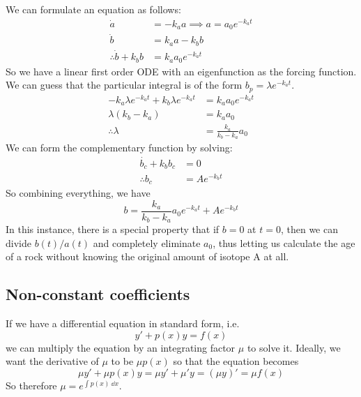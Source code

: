 We can formulate an equation as follows:
\begin{align*}
	\dot a                    & = -k_a a \implies a = a_0 e^{-k_a t} \\
	\dot b                    & = k_a a - k_b b                      \\
	\therefore \dot b + k_b b & = k_a a_0 e^{-k_a t}
\end{align*}
So we have a linear first order ODE with an eigenfunction as the forcing function.
We can guess that the particular integral is of the form \(b_p = \lambda e^{-k_a t}\).
\begin{align*}
	-k_a\lambda e^{-k_a t} + k_b \lambda e^{-k_a t} & = k_a a_0 e^{-k_a t}        \\
	\lambda(k_b-k_a)                                & = k_a a_0                   \\
	\therefore \lambda                              & = \frac{k_a}{k_b - k_a} a_0
\end{align*}
We can form the complementary function by solving:
\begin{align*}
	\dot{b_c} + k_b b_c & = 0           \\
	\therefore b_c      & = Ae^{-k_b t}
\end{align*}
So combining everything, we have
\[
	b = \frac{k_a}{k_b - k_a} a_0 e^{-k_a t} + Ae^{-k_b t}
\]
In this instance, there is a special property that if \(b=0\) at \(t=0\), then we can divide \(b(t)/a(t)\) and completely eliminate \(a_0\), thus letting us calculate the age of a rock without knowing the original amount of isotope A at all.

\subsection{Non-constant coefficients}
If we have a differential equation in standard form, i.e.
\[
	y' + p(x)y = f(x)
\]
we can multiply the equation by an integrating factor \(\mu\) to solve it.
Ideally, we want the derivative of \(\mu\) to be \(\mu p(x)\) so that the equation becomes
\[
	\mu y' + \mu p(x) y = \mu y' + \mu' y = (\mu y)' = \mu f(x)
\]
So therefore \(\mu = e^{\int p(x)\ \dd{x}}\).
